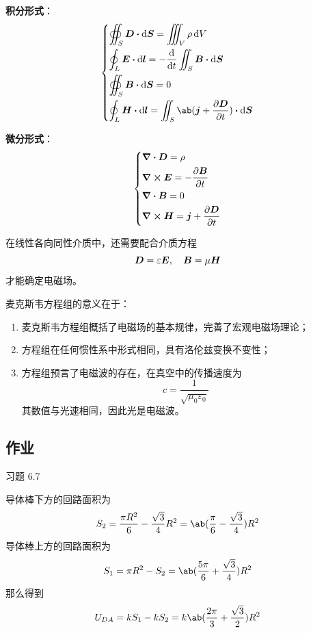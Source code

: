 \textbf{积分形式}：
$$
\begin{dcases}
	\oiint_S \vect{D} \vdot \dd{\vect{S}} = \iiint_V \rho \dd{V} \\
	\oint_L \vect{E} \vdot \dd{\vect{l}} = - \dv{t} \iint_S \vect{B} \vdot \dd{\vect{S}} \\
	\oiint_S \vect{B} \vdot \dd{\vect{S}} = 0 \\
	\oint_L \vect{H} \vdot \dd{\vect{l}} = \iint_S \ab(\vect{j} + \pdv{\vect{D}}{t}) \vdot \dd{\vect{S}}
\end{dcases}
$$

\textbf{微分形式}：
$$
\begin{dcases}
	\div \boldsymbol{D} = \rho \\
	\curl \boldsymbol{E} = - \pdv{\boldsymbol{B}}{t} \\
	\div \boldsymbol{B} = 0 \\
	\curl \boldsymbol{H} = \boldsymbol{j} + \pdv{\boldsymbol{D}}{t}
\end{dcases}
$$

在线性各向同性介质中，还需要配合介质方程
$$
\boldsymbol{D} = \varepsilon \boldsymbol{E},\quad \boldsymbol{B} = \mu \boldsymbol{H}
$$
才能确定电磁场。

麦克斯韦方程组的意义在于：

\begin{enumerate}
	\item 麦克斯韦方程组概括了电磁场的基本规律，完善了宏观电磁场理论；
	\item 方程组在任何惯性系中形式相同，具有洛伦兹变换不变性；
	\item 方程组预言了电磁波的存在，在真空中的传播速度为
	$$
	c = \frac{1}{\sqrt{\mu_0 \varepsilon_0}}
	$$
	其数值与光速相同，因此光是电磁波。
\end{enumerate}

\subsection{作业}

\begin{problem}
	习题 6.7
	\begin{solution}
		导体棒下方的回路面积为
		$$
		S_2 = \frac{\pi R^2}{6} - \frac{\sqrt{3}}{4} R^2 = \ab(\frac{\pi}{6} - \frac{\sqrt{3}}{4}) R^2
		$$
		导体棒上方的回路面积为
		$$
		S_1 = \pi R^2 - S_2 = \ab(\frac{5 \pi}{6} + \frac{\sqrt{3}}{4}) R^2
		$$
		那么得到
		$$
		U_{DA} = k S_1 - k S_2 = k \ab(\frac{2\pi}{3} + \frac{\sqrt{3}}{2}) R^2
		$$
	\end{solution}
\end{problem}

